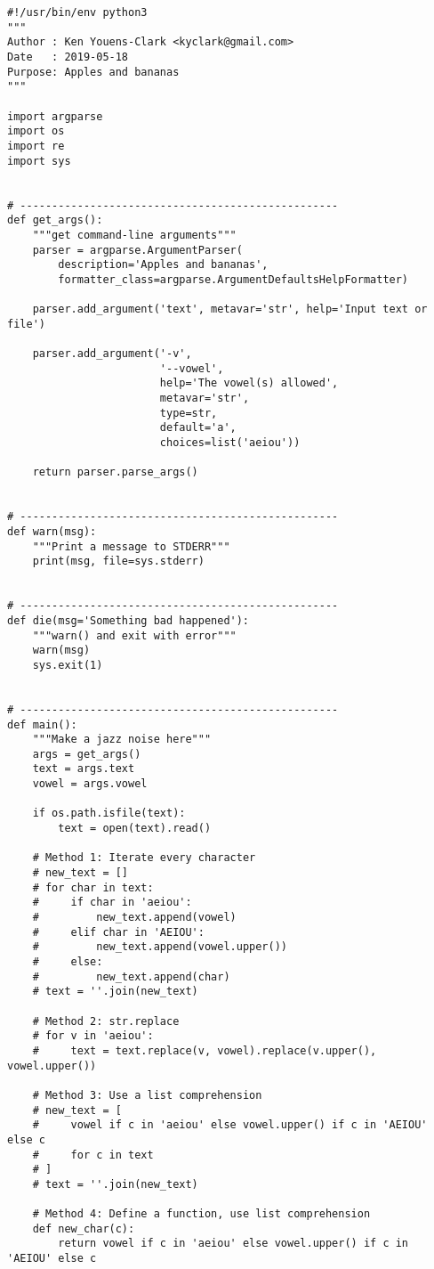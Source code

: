 \documentclass[]{article}
\begin{document}
\begin{verbatim}
#!/usr/bin/env python3
"""
Author : Ken Youens-Clark <kyclark@gmail.com>
Date   : 2019-05-18
Purpose: Apples and bananas
"""

import argparse
import os
import re
import sys


# --------------------------------------------------
def get_args():
    """get command-line arguments"""
    parser = argparse.ArgumentParser(
        description='Apples and bananas',
        formatter_class=argparse.ArgumentDefaultsHelpFormatter)

    parser.add_argument('text', metavar='str', help='Input text or file')

    parser.add_argument('-v',
                        '--vowel',
                        help='The vowel(s) allowed',
                        metavar='str',
                        type=str,
                        default='a',
                        choices=list('aeiou'))

    return parser.parse_args()


# --------------------------------------------------
def warn(msg):
    """Print a message to STDERR"""
    print(msg, file=sys.stderr)


# --------------------------------------------------
def die(msg='Something bad happened'):
    """warn() and exit with error"""
    warn(msg)
    sys.exit(1)


# --------------------------------------------------
def main():
    """Make a jazz noise here"""
    args = get_args()
    text = args.text
    vowel = args.vowel

    if os.path.isfile(text):
        text = open(text).read()

    # Method 1: Iterate every character
    # new_text = []
    # for char in text:
    #     if char in 'aeiou':
    #         new_text.append(vowel)
    #     elif char in 'AEIOU':
    #         new_text.append(vowel.upper())
    #     else:
    #         new_text.append(char)
    # text = ''.join(new_text)

    # Method 2: str.replace
    # for v in 'aeiou':
    #     text = text.replace(v, vowel).replace(v.upper(), vowel.upper())

    # Method 3: Use a list comprehension
    # new_text = [
    #     vowel if c in 'aeiou' else vowel.upper() if c in 'AEIOU' else c
    #     for c in text
    # ]
    # text = ''.join(new_text)

    # Method 4: Define a function, use list comprehension
    def new_char(c):
        return vowel if c in 'aeiou' else vowel.upper() if c in 'AEIOU' else c


\end{verbatim}
\end{document}
